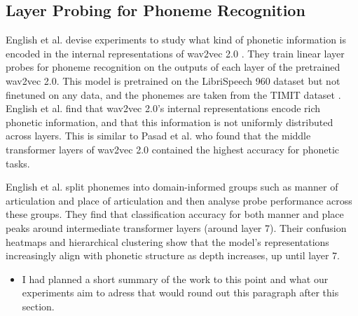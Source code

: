 \subsection{Layer Probing for Phoneme Recognition}\label{bac_subsec:layer_probing_articulation}
English et al. devise experiments to study what kind of phonetic information is encoded in the internal representations of wav2vec 2.0 \cite{english2022domain}. They train linear layer probes  \cite{immer2021probing, schneiderleveraging} for phoneme recognition on the outputs of each layer of the pretrained wav2vec 2.0. This model is pretrained on the LibriSpeech 960 dataset \cite{librispeech} but not finetuned on any data, and the phonemes are taken from the TIMIT dataset \cite{timit}. English et al. find that wav2vec 2.0’s internal representations encode rich phonetic information, and that this information is not uniformly distributed across layers. This is similar to Pasad et al. \cite{pasad2021layer} who found that the middle transformer layers of wav2vec 2.0 contained the highest accuracy for phonetic tasks. 

English et al. split phonemes into domain-informed groups such as manner of articulation and place of articulation and then analyse probe performance across these groups. They find that classification accuracy for both manner and place peaks around intermediate transformer layers (around layer 7). Their confusion heatmaps and hierarchical clustering show that the model’s representations increasingly align with phonetic structure as depth increases, up until layer 7. 

\begin{itemize}
    \item I had planned a short summary of the work to this point and what our experiments aim to adress that would round out this paragraph after this section.
\end{itemize}

